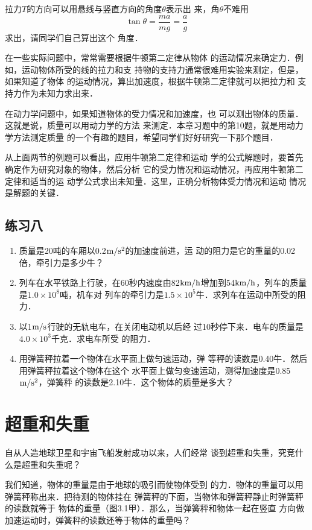     拉力$T$的方向可以用悬线与竖直方向的角度$\theta$表示出
来，角$\theta$不难用\[\tan\theta =\frac{ma}{mg}=\frac{a}{g} \]
求出，请同学们自己算出这个
角度．

    在一些实际问题中，常常需要根据牛顿第二定律从物体
的运动情况来确定力．例如，运动物体所受的线的拉力和支
持物的支持力通常很难用实验来测定，但是，如果知道了物体
的运动情况，算出加速度，根据牛顿第二定律就可以把拉力和
支持力作为未知力求出来．

    在动力学问题中，如果知道物体的受力情况和加速度，也
可以测出物体的质量．这就是说，质量可以用动力学的方法
来测定．本章习题中的第10题，就是用动力学方法测定质量
的一个有趣的题目，希望同学们好好研究一下那个题目．

    从上面两节的例题可以看出，应用牛顿第二定律和运动
学的公式解题时，要首先确定作为研究对象的物体，然后分析
它的受力情况和运动情况，再应用牛顿第二定律和适当的运
动学公式求出未知量．这里，正确分析物体受力情况和运动
情况是解题的关键．

 \subsection*{练习八}
\begin{enumerate}
\item 质量是20吨的车厢以0.2$\text{m}/\text{s}^2$的加速度前进，运
动的阻力是它的重量的0.02倍，牵引力是多少牛？
\item  列车在水平铁路上行驶，在60秒内速度由82$\text{km}/\text{h}$增加到54$\text{km}/\text{h}$，列车的质量是$1.0\times 10^8$吨，机车对
列车的牵引力是$1.5\times 10^5$牛．求列车在运动中所受的阻力．
\item  以1$\text{m}/\text{s}$行驶的无轨电车，在关闭电动机以后经
过10秒停下来．电车的质量是$4.0\times 10^3$千克．求电车所受
的阻力．
\item  用弹簧秤拉着一个物体在水平面上做匀速运动，弹
等秤的读数是0.40牛．然后用弹簧秤拉着这个物体在这个
水平面上做匀变速运动，测得加速度是0.85$\text{m}/\text{s}^2$，弹簧秤
的读数是2.10牛．这个物体的质量是多大？
\end{enumerate}

\section{超重和失重}
    自从人造地球卫星和宇宙飞船发射成功以来，人们经常
谈到超重和失重，究竞什么是超重和失重呢？

    我们知道，物体的重量是由于地球的吸引而使物体受到
的力．物体的重量可以用弹簧秤称出来．把待测的物体挂在
弹簧秤的下面，当物体和弹簧秤静止时弹簧秤的读数就等于
物体的重量（图3.1甲）．那么，当弹簧秤和物体一起在竖直
方向做加速运动时，弹簧秤的读数还等于物体的重量吗？

